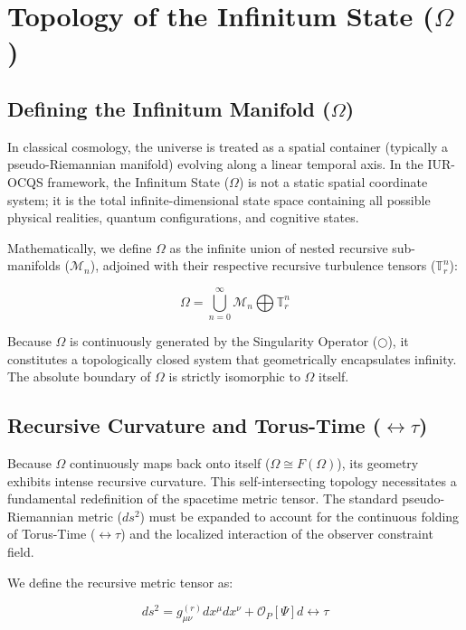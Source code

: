 \documentclass[12pt,openany]{book}
\begin{document}
\chapter{Topology of the Infinitum State ($\Omega$)}

\section{Defining the Infinitum Manifold ($\Omega$)}
In classical cosmology, the universe is treated as a spatial container (typically a pseudo-Riemannian manifold) evolving along a linear temporal axis. In the IUR-OCQS framework, the Infinitum State ($\Omega$) is not a static spatial coordinate system; it is the total infinite-dimensional state space containing all possible physical realities, quantum configurations, and cognitive states. 

Mathematically, we define $\Omega$ as the infinite union of nested recursive sub-manifolds ($\mathcal{M}_n$), adjoined with their respective recursive turbulence tensors ($\mathbb{T}_r^n$):

\begin{equation}
\Omega = \bigcup_{n=0}^{\infty} \mathcal{M}_n \bigoplus \mathbb{T}_r^n
\end{equation}

Because $\Omega$ is continuously generated by the Singularity Operator ($\bigcirc$), it constitutes a topologically closed system that geometrically encapsulates infinity. The absolute boundary of $\Omega$ is strictly isomorphic to $\Omega$ itself.

\section{Recursive Curvature and Torus-Time ($\leftrightarrow\tau$)}
Because $\Omega$ continuously maps back onto itself ($\Omega \cong F(\Omega)$), its geometry exhibits intense recursive curvature. This self-intersecting topology necessitates a fundamental redefinition of the spacetime metric tensor. The standard pseudo-Riemannian metric ($ds^2$) must be expanded to account for the continuous folding of Torus-Time ($\leftrightarrow\tau$) and the localized interaction of the observer constraint field.

We define the recursive metric tensor as:

\begin{equation}
ds^2 = g_{\mu\nu}^{(r)} dx^\mu dx^\nu + \mathcal{O}_P[\Psi] d\leftrightarrow\tau
\end{equation}
\end{document}
